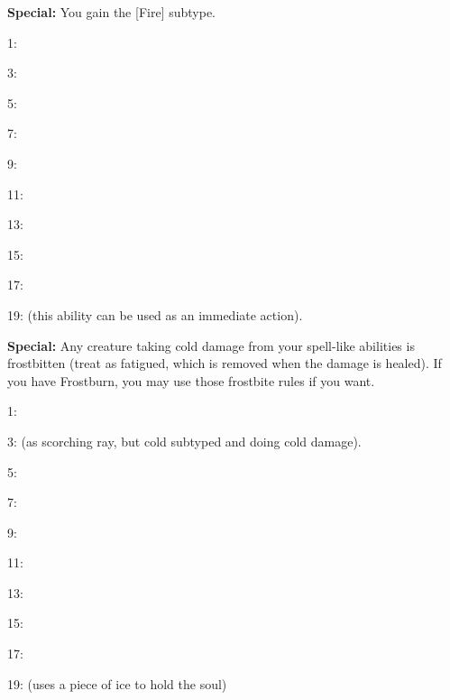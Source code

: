 \begin{multicols}{2}
\begin{description*}
\item {}
\item \textbf{Special:} You gain the [Fire] subtype.
	\item[1:] 
	\item[3:] 
	\item[5:] 
	\item[7:] 
	\item[9:] 
	\item[11:] 
	\item[13:] 
	\item[15:] 
	\item[17:] 
	\item[19:]  (this ability can be used as an immediate action).
\end{description*}

\begin{description*}
\item {}
\item \textbf{Special:} Any creature taking cold damage from your spell-like abilities is frostbitten (treat as fatigued, which is removed when the damage is healed). If you have Frostburn, you may use those frostbite rules if you want.
	\item[1:] 
	\item[3:]  (as scorching ray, but cold subtyped and doing cold damage).
	\item[5:] 
	\item[7:] 
	\item[9:] 
	\item[11:] 
	\item[13:] 
	\item[15:] 
	\item[17:] 
	\item[19:]  (uses a piece of ice to hold the soul)
\end{description*}


\end{multicols}
